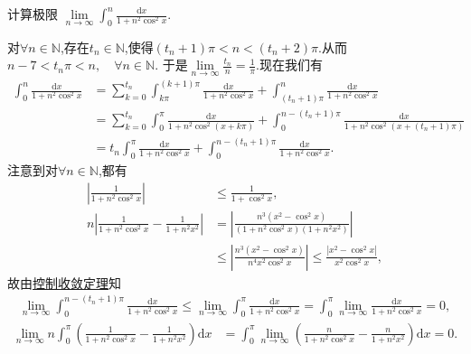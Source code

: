 \documentclass[../../main.tex]{subfiles}
\begin{document}
\begin{example}
计算极限 $\lim\limits_{n \to \infty} \int_{0}^{n} \frac{\mathrm{d}x}{1 + n^2 \cos^2 x}$.
\end{example}
\begin{solution}
对$\forall n\in \mathbb{N}$,存在$t_n\in \mathbb{N}$,使得$\left( t_n+1 \right) \pi <n<\left( t_n+2 \right) \pi$.从而
$n-7<t_n\pi <n,\quad \forall n\in \mathbb{N}$.
于是$\lim\limits_{n\rightarrow \infty}\frac{t_n}{n}=\frac{1}{\pi}$.现在我们有
\begin{align}
\int_0^n{\frac{\mathrm{d}x}{1+n^2\cos ^2x}}&=\sum\limits_{k=0}^{t_n}{\int_{k\pi}^{\left( k+1 \right) \pi}{\frac{\mathrm{d}x}{1+n^2\cos ^2x}}}+\int_{\left( t_n+1 \right) \pi}^n{\frac{\mathrm{d}x}{1+n^2\cos ^2x}} \nonumber \\
&=\sum\limits_{k=0}^{t_n}{\int_0^{\pi}{\frac{\mathrm{d}x}{1+n^2\cos ^2\left( x+k\pi \right)}}}+\int_0^{n-\left( t_n+1 \right) \pi}{\frac{\mathrm{d}x}{1+n^2\cos ^2\left( x+\left( t_n+1 \right) \pi \right)}} \nonumber \\
&=t_n\int_0^{\pi}{\frac{\mathrm{d}x}{1+n^2\cos ^2x}}+\int_0^{n-\left( t_n+1 \right) \pi}{\frac{\mathrm{d}x}{1+n^2\cos ^2x}}. \label{eq:177.12}
\end{align}
注意到对$\forall n\in \mathbb{N}$,都有
\begin{align*}
\left| \frac{1}{1+n^2\cos ^2x} \right|&\leqslant \frac{1}{1+\cos ^2x}, \\
n\left| \frac{1}{1+n^2\cos ^2x}-\frac{1}{1+n^2x^2} \right|&=\left| \frac{n^3\left( x^2-\cos ^2x \right)}{\left( 1+n^2\cos ^2x \right) \left( 1+n^2x^2 \right)} \right| \\
&\leqslant \left| \frac{n^3\left( x^2-\cos ^2x \right)}{n^4x^2\cos ^2x} \right|\leqslant \frac{\left| x^2-\cos ^2x \right|}{x^2\cos ^2x},
\end{align*}
故由\hyperref[Real Analysis-theorem:控制收敛定理]{控制收敛定理}知
\begin{align}
\lim\limits_{n\rightarrow \infty}\int_0^{n-\left( t_n+1 \right) \pi}{\frac{\mathrm{d}x}{1+n^2\cos ^2x}}\leqslant \lim\limits_{n\rightarrow \infty}\int_0^{\pi}{\frac{\mathrm{d}x}{1+n^2\cos ^2x}}=\int_0^{\pi}{\lim\limits_{n\rightarrow \infty}\frac{\mathrm{d}x}{1+n^2\cos ^2x}}=0, \label{eq:177.13}
\end{align}
\begin{align*}
\lim\limits_{n\rightarrow \infty}n\int_0^{\pi}{\left( \frac{1}{1+n^2\cos ^2x}-\frac{1}{1+n^2x^2} \right) \mathrm{d}x}&=\int_0^{\pi}{\lim\limits_{n\rightarrow \infty}\left( \frac{n}{1+n^2\cos ^2x}-\frac{n}{1+n^2x^2} \right) \mathrm{d}x}=0.

\end{align*}
\end{solution}
\end{document}
